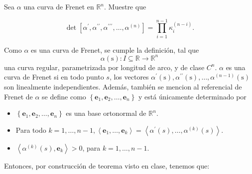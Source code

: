 





\begin{problema}
    
    Sea $\alpha$ una curva de Frenet en $\mathbb{R}^{n}$. Muestre que

$$
\operatorname{det}\left[\alpha^{\prime}, \alpha^{\prime \prime}, \alpha^{\prime \prime \prime}, \ldots, \alpha^{(n)}\right]=\prod_{i=1}^{n-1} \kappa_{i}^{(n-i)} .
$$
    \begin{sol}
        Como $\alpha$ es una curva de Frenet, se cumple la definición, tal que  $$\alpha(\mathrm{s}): I \subseteq \mathbb{R} \rightarrow \mathbb{R}^n$$ una curva regular, parametrizada por longitud de arco, y de clase $C^n$. $\alpha$ es una curva de Frenet si en todo punto $s$, los vectores $\alpha^{\prime}(\mathrm{s}), \alpha^{\prime \prime}(\mathrm{s}), \ldots, \alpha^{(n-1)}(\mathrm{s})$ son linealmente independientes. 
        Además, también se mencion al referencial de Frenet de $\alpha$ se define como $\left\{\mathbf{e}_1, \mathbf{e}_2, \ldots, \mathbf{e}_n\right\}$ y está únicamente determinado por
        \begin{itemize}
            \item $\left\{\mathbf{e}_1, \mathbf{e}_2, \ldots, \mathbf{e}_n\right\}$ es una base ortonormal de $\mathbb{R}^n$.
            \item Para todo $k=1, \ldots, n-1,\left\langle\mathbf{e}_1, \ldots, \mathbf{e}_k\right\rangle=\left\langle\alpha^{\prime}(s), \ldots, \alpha^{(k)}(s)\right\rangle$.
            \item $\left\langle\alpha^{(k)}(s), \mathbf{e}_k\right\rangle>0$, para $k=1, \ldots, n-1$.
        \end{itemize}
        Entonces, por construcción de teorema visto en clase, tenemos que: 

\end{sol}
\end{problema}
